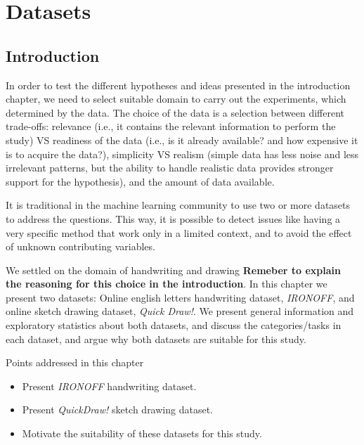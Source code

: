 \chapter{Datasets}

\section{Introduction}
\par In order to test the different hypotheses and ideas presented in the introduction chapter, we need to select suitable domain to carry out the experiments, which determined by the data. The choice of the data is a selection between different trade-offs: relevance (i.e., it contains the relevant information to perform the study) VS readiness of the data (i.e., is it already available? and how expensive it is to acquire the data?), simplicity VS realism (simple data has less noise and less irrelevant patterns, but the ability to handle realistic data provides stronger support for the hypothesis), and the amount of data available.

\par It is traditional in the machine learning community to use two or more datasets to address the questions. This way, it is possible to detect issues like having a very specific method that work only in a limited context, and to avoid the effect of unknown contributing variables.

\par We settled on the domain of handwriting and drawing \textbf{Remeber to explain the reasoning for this choice in the introduction}. In this chapter we present two datasets: Online english letters handwriting dataset, \textit{IRONOFF}, and online sketch drawing dataset, \textit{Quick Draw!}. We present general information and exploratory statistics about both datasets, and discuss the categories/tasks in each dataset, and argue why both datasets are suitable for this study.

\begin{mdframed}[backgroundcolor=blue!20]
    \begin{center}
        Points addressed in this chapter
    \end{center}

    \begin{itemize}[noitemsep]
        \item Present \textit{IRONOFF} handwriting dataset.
        \item Present \textit{QuickDraw!} sketch drawing dataset.
        \item Motivate the suitability of these datasets for this study.
    \end{itemize}
\end{mdframed}

